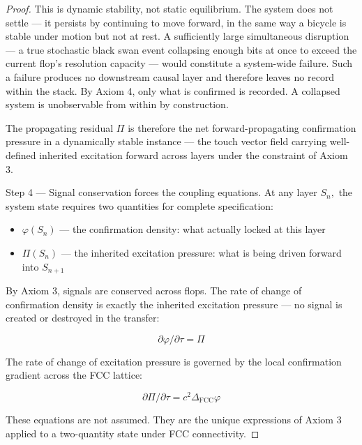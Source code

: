 \documentclass[11pt,oneside]{report}
\theoremstyle{definition}
\theoremstyle{remark}
\begin{document}
\begin{proof}
This is dynamic stability, not static equilibrium. The system does not
settle --- it persists by continuing to move forward, in the same way a
bicycle is stable under motion but not at rest. A sufficiently large
simultaneous disruption --- a true stochastic black swan event
collapsing enough bits at once to exceed the current flop's resolution
capacity --- would constitute a system-wide failure. Such a failure
produces no downstream causal layer and therefore leaves no record
within the stack. By Axiom 4, only what is confirmed is recorded. A
collapsed system is unobservable from within by construction.

The propagating residual \ensuremath{\Pi} is therefore the net forward-propagating
confirmation pressure in a dynamically stable instance --- the touch
vector field carrying well-defined inherited excitation forward across
layers under the constraint of Axiom 3.

Step 4 --- Signal conservation forces the coupling equations. At any
layer \ensuremath{S_{n},} the system state requires two quantities for complete
specification:

\begin{itemize}
\item
  \ensuremath{\varphi (S_{n})} --- the confirmation density: what actually locked at this layer
\item
  \ensuremath{\Pi (S_{n})} --- the inherited excitation pressure: what is being driven
  forward into \ensuremath{S_{n+1}}
\end{itemize}

By Axiom 3, signals are conserved across flops. The rate of change of
confirmation density is exactly the inherited excitation pressure --- no
signal is created or destroyed in the transfer:

\begin{equation*}
\partial \varphi / \partial \tau = \Pi
\end{equation*}

The rate of change of excitation pressure is governed by the local
confirmation gradient across the FCC lattice:

\begin{equation*}
\partial \Pi / \partial \tau = c^{2} \Delta_{\mathrm{FCC}} \varphi
\end{equation*}

These equations are not assumed. They are the unique expressions of
Axiom 3 applied to a two-quantity state under FCC connectivity.

\end{proof}
\end{document}
